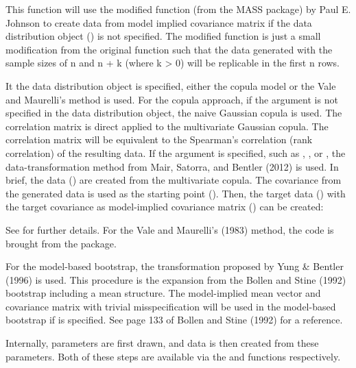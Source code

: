 \documentclass[a4paper]{book}
\begin{document}
\begin{Details}\relax
This function will use the modified  function (from the MASS package) by Paul E. Johnson  to create data from model implied covariance matrix if the data distribution object () is not specified. The modified function is just a small modification from the original  function such that the data generated with the sample sizes of n and n + k (where k > 0) will be replicable in the first n rows.

It the data distribution object is specified, either the copula model or the Vale and Maurelli's method is used. For the copula approach, if the  argument is not specified in the data distribution object, the naive Gaussian copula is used. The correlation matrix is direct applied to the multivariate Gaussian copula. The correlation matrix will be equivalent to the Spearman's correlation (rank correlation) of the resulting data. If the  argument is specified, such as , , or , the data-transformation method from Mair, Satorra, and Bentler (2012) is used. In brief, the data () are created from the multivariate copula. The covariance from the generated data is used as the starting point (). Then, the target data () with the target covariance as model-implied covariance matrix () can be created:


See  for further details. For the Vale and Maurelli's (1983) method, the code is brought from the  package.

For the model-based bootstrap, the transformation proposed by Yung \& Bentler (1996) is used. This procedure is the expansion from the Bollen and Stine (1992) bootstrap including a mean structure. The model-implied mean vector and covariance matrix with trivial misspecification will be used in the model-based bootstrap if  is specified. See page 133 of Bollen and Stine (1992) for a reference. 

Internally, parameters are first drawn, and data is then created from these parameters. Both of these steps are available via the  and  functions respectively.
\end{Details}
\end{document}
